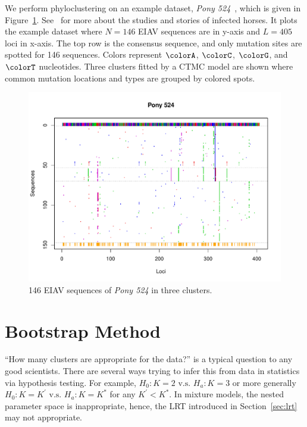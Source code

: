 We perform phyloclustering on an example dataset,
{\it Pony 524}~\citep{Carpenter2011},
which is given in Figure~\ref{fig:eiav}.
See~\citet{Baccam2003} for more about the studies and stories of infected
horses.
It plots the example dataset where $N = 146$ EIAV sequences
are in y-axis and $L = 405$ loci in x-axis.
The top row is the consensus sequence, and only mutation sites are spotted
for 146 sequences. Colors represent $\colorA$, $\colorC$, $\colorG$, and
$\colorT$ nucleotides. Three clusters fitted by a CTMC model are shown where
common mutation locations and types are grouped by colored spots.
\begin{figure}[h!tb]
\centering
 \includegraphics[width=6.5in]{pbdDEMO-include/pics/pony524}
\caption{146 EIAV sequences of {\it Pony 524} in three clusters.}
\label{fig:eiav}
\end{figure}




\section{Bootstrap Method}
\label{sec:bootstrap}

``How many clusters are appropriate for the data?'' is a typical question
to any good scientists. There are several ways trying to infer this from
data in statistics via hypothesis testing. For example,
$H_0: K = 2 \mbox{ v.s. } H_a: K = 3$ or more generally
$H_0: K = K^\prime \mbox{ v.s. } H_a: K = K^*$ for any $K^\prime < K^*$.
In mixture models, the nested parameter space is inappropriate, hence,
the LRT introduced in Section~\ref{sec:lrt} may not appropriate.


